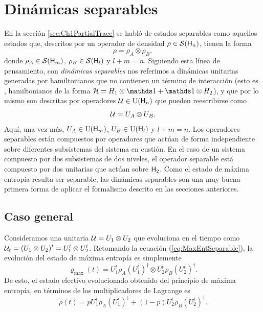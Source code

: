 \section{Dinámicas separables}

En la sección \ref{sec:Ch1PartialTrace} se habló de estados separables como aquellos estados que, descritos por un operador de densidad $\rho\in\mathcal{S}({\sf H}_{n})$, tienen la forma
\begin{equation*}
    \rho=\rho_{A}\otimes\rho_{B},
\end{equation*}
donde $\rho_{A}\in\mathcal{S}({\sf H}_{m})$, $\rho_{B}\in\mathcal{S}({\sf H}_{l})$ y $l+m=n$. Siguiendo esta línea de pensamiento, con \textit{dinámicas separables} nos referimos a dinámicas unitarias generadas por hamiltonianos que no contienen un término de interacción (esto es , hamiltonianos de la forma $\mcH=H_{1}\otimes\Id+\Id\otimes H_{2}$), y que por lo mismo son descritas por operadores $\mathcal{U}\in\text{U}({\sf H}_{n})$ que pueden reescribirse como
\begin{equation*}
    \mathcal{U}=U_{A}\otimes U_{B}.
\end{equation*}
Aquí, una vez más, $U_{A}\in\text{U}({\sf H}_{m})$, $U_{B}\in\text{U}({\sf H}_{l})$ y $l+m=n$. Los operadores separables están compuestos por operadores que actúan de forma independiente sobre diferentes subsistemas del sistema en custión. En el caso de un sistema compuesto por dos subsistemas de dos niveles, el operador separable está compuesto por dos unitarias que actúan sobre ${\sf H}_{2}$. Como el estado de máxima entropía resulta ser separable, las dinámicas separables son una muy buena primera forma de aplicar el formalismo descrito en las secciones anteriores.

\subsection{Caso general}

Consideramos una unitaria $\mathcal{U}=U_{1}\otimes U_{2}$ que evoluciona en el tiempo como $\mathcal{U}_{t}=(U_{1}\otimes U_{2})^{t}=U_{1}^{t}\otimes U_{2}^{t}$. Retomando la ecuación (\ref{eq:MaxEntSeparable}), la evolución del estado de máxima entropía es simplemente
\begin{equation*}
    \varrho_{\max}(t)=U_{1}^{t}\rho_{A}(U_{1}^{t})^{\dag}\otimes U_{2}^{t}\rho_{B} (U_{2}^{t})^{\dag}.
\end{equation*}
De esto, el estado efectivo evolucionado obtenido del principio de máxima entropía, en términos de los multiplicadores de Lagrange es
\begin{equation}\label{eq:SeparableEvolution}
    \rho(t)=pU_{1}^{t}\rho_{A}(U_{1}^{t})^{\dag}+(1-p)U_{2}^{t}\rho_{B} (U_{2}^{t})^{\dag}.
\end{equation}

